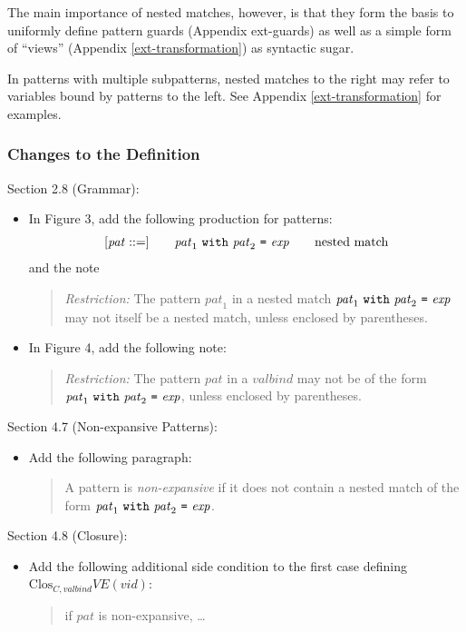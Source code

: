 \documentclass[twoside,titlepage]{article}
\begin{document}
\begin{appendix}
The main importance of nested matches, however, is that they form the basis to uniformly define pattern guards (Appendix {ext-guards}) as well as a simple form of ``views'' (Appendix \ref{ext-transformation}) as syntactic sugar.

In patterns with multiple subpatterns, nested matches to the right may refer to variables bound by patterns to the left. See Appendix \ref{ext-transformation} for examples.

\subsubsection*{Changes to the Definition}

Section 2.8 (Grammar):
\begin{itemize}
\item In Figure 3, add the following production for patterns:
  $$
  \begin{array}{l@{\qquad}l@{\qquad}l}
   [\mathit{pat} ::=] & \mathit{pat}_1~{\tt{with}}~\mathit{pat}_2~\mbox{\tt=}~\mathit{exp} & \textrm{nested match}
  \end{array}
  $$
  and the note
  \begin{quote}
  {\it Restriction:} The pattern $\mathit{pat}_1$ in a nested match $\mathit{pat}_1~{\tt{with}}~\mathit{pat}_2~\mbox{\tt=}~\mathit{exp}$ may not itself be a nested match, unless enclosed by parentheses.
  \end{quote}

\item In Figure 4, add the following note:
  \begin{quote}
  {\it Restriction:} The pattern $\mathit{pat}$ in a $\mathit{valbind}$ may not be of the form $\mathit{pat}_1~{\tt{with}}~\mathit{pat}_2~\mbox{\tt=}~\mathit{exp}$, unless enclosed by parentheses.
  \end{quote}
\end{itemize}

Section 4.7 (Non-expansive Patterns):
\begin{itemize}
\item Add the following paragraph:
  \begin{quote}
  A pattern is \emph{non-expansive} if it does not contain a nested match of the form $\mathit{pat}_1~{\tt{with}}~\mathit{pat}_2~\mbox{\tt=}~\mathit{exp}$.
  \end{quote}
\end{itemize}

Section 4.8 (Closure):
\begin{itemize}
\item Add the following additional side condition to the first case defining $\mbox{Clos}_{C,\mathit{valbind}}\mathit{VE}(\mathit{vid})$:
  \begin{quote}
  if $\mathit{pat}$ is non-expansive, \dots
  \end{quote}
\end{itemize}


\end{appendix}
\end{document}

